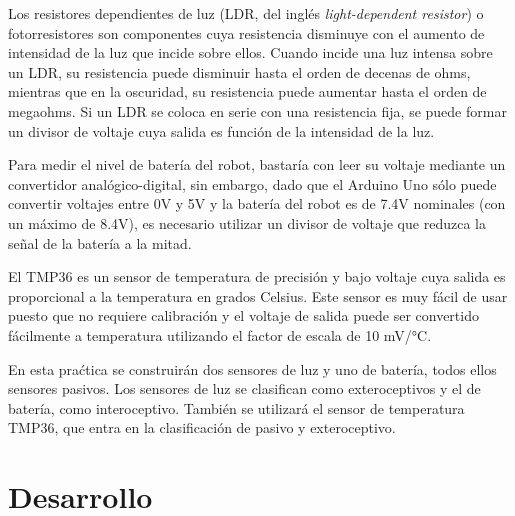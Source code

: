 \documentclass[a4paper,12pt]{article}
\begin{document}
Los resistores dependientes de luz (LDR, del inglés \textit{light-dependent resistor}) o fotorresistores son componentes cuya resistencia disminuye con el aumento de intensidad de la luz que incide sobre ellos. Cuando incide una luz intensa sobre un LDR, su resistencia puede disminuir hasta el orden de decenas de ohms, mientras que en la oscuridad, su resistencia puede aumentar hasta el orden de megaohms. Si un LDR se coloca en serie con una resistencia fija, se puede formar un divisor de voltaje cuya salida es función de la intensidad de la luz. 

Para medir el nivel de batería del robot, bastaría con leer su voltaje mediante un convertidor analógico-digital, sin embargo, dado que el Arduino Uno sólo puede convertir voltajes entre 0V y 5V y la batería del robot es de 7.4V nominales (con un máximo de 8.4V), es necesario utilizar un divisor de voltaje que reduzca la señal de la batería a la mitad. 

El TMP36 es un sensor de temperatura de precisión y bajo voltaje cuya salida es proporcional a la temperatura en grados Celsius. Este sensor es muy fácil de usar puesto que no requiere calibración y el voltaje de salida puede ser convertido fácilmente a temperatura utilizando el factor de escala de 10 mV/\si{\degree}C.

En esta praćtica se construirán dos sensores de luz y uno de batería, todos ellos sensores pasivos. Los sensores de luz se clasifican como exteroceptivos y el de batería, como interoceptivo. También se utilizará el sensor de temperatura TMP36, que entra en la clasificación de pasivo y exteroceptivo. 

\section{Desarrollo}
\end{document}
